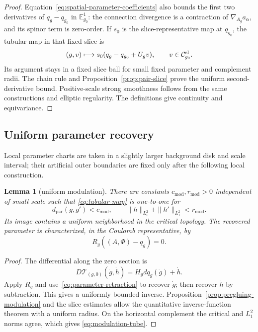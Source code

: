 \documentclass[11pt]{amsart}
\newtheorem{lemma}[theorem]{Lemma}
\theoremstyle{definition}
\theoremstyle{remark}
\theoremstyle{plain}
\newcommand{\cC}{\mathcal{C}}
\begin{document}
\begin{proof}
Equation~\eqref{eq:spatial-parameter-coefficients} also bounds the first
two derivatives of $q_g-q_{g_0}$ in $\mathbb E_{g_0}^1$:
the connection divergence is a contraction of $\nabla_{A_g}a_\alpha$,
and its spinor term is zero-order.  If $s_0$ is the slice-representative
map at $q_{g_0}$, the tubular map in that fixed slice is
\begin{equation}\label{eq:fixed-slice-tubular-map}
 (g,v)\longmapsto s_0(q_g-q_{g_0}+U_gv),\qquad
 v\in\cC_{g_0}^{\rm sl}.
\end{equation}
Its argument stays in a fixed slice ball for small fixed parameter
and complement radii.  The chain rule and
Proposition~\ref{prop:pair-slice} prove the uniform second-derivative
bound.  Positive-scale strong smoothness follows from the same
constructions and elliptic regularity.  The definitions give continuity
and equivariance.
\end{proof}

\subsection{Uniform parameter recovery}
Local parameter charts are taken in a slightly larger background disk
and scale interval; their artificial outer boundaries are fixed only
after the following local construction.

\begin{lemma}[uniform modulation]\label{lem:modulation}
There are constants
$c_{\mathrm{mod}},r_{\mathrm{mod}}>0$ independent of small scale such that
\eqref{eq:tubular-map} is one-to-one for
\begin{equation}\label{eq:modulation-tube}
 d_{\mathrm{par}}(g,g')<c_{\mathrm{mod}},\qquad
 \|h\|_{L^2_1}+\|h'\|_{L^2_1}<r_{\mathrm{mod}}.
\end{equation}
Its image contains a uniform neighborhood in the critical topology.  The
recovered parameter is characterized, in the Coulomb representative, by
\begin{equation}\label{eq:modulation-characterization}
 R_g((A,\Phi)-q_g)=0.
\end{equation}
\end{lemma}
\begin{proof}
The differential along the zero section is
\begin{equation}\label{eq:modulation-differential}
 D\mathcal T_{(g,0)}(\dot g,\dot h)=H_gdq_g(\dot g)+\dot h.
\end{equation}
Apply $R_g$ and use~\eqref{eq:parameter-retraction} to recover $\dot g$;
then recover $\dot h$ by subtraction.  This gives a uniformly bounded
inverse.  Proposition~\ref{prop:pregluing-modulation} and the slice estimates allow the
quantitative inverse-function theorem with a uniform radius.  On the
horizontal complement the critical and $L^2_1$ norms agree, which gives
\eqref{eq:modulation-tube}.
\end{proof}
\end{document}
